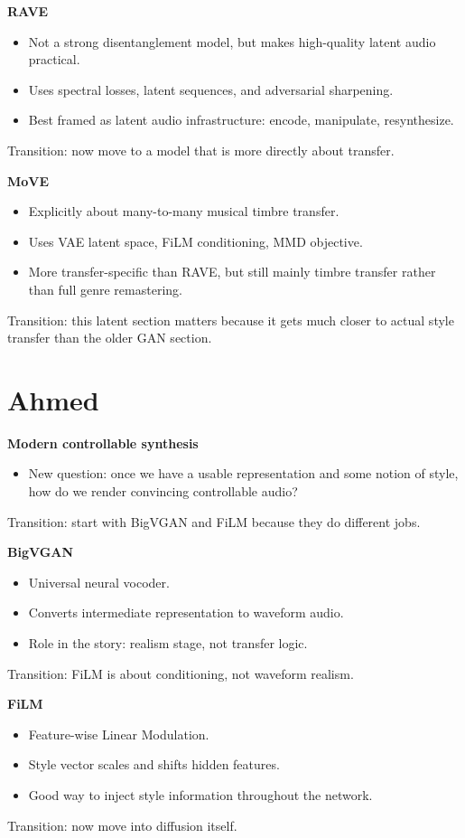 \documentclass[11pt]{article}
\begin{document}
\textbf{RAVE}
\begin{itemize}
\item Not a strong disentanglement model, but makes high-quality latent audio practical.
\item Uses spectral losses, latent sequences, and adversarial sharpening.
\item Best framed as latent audio infrastructure: encode, manipulate, resynthesize.
\end{itemize}
\textcolor{Muted}{Transition: now move to a model that is more directly about transfer.}

\textbf{MoVE}
\begin{itemize}
\item Explicitly about many-to-many musical timbre transfer.
\item Uses VAE latent space, FiLM conditioning, MMD objective.
\item More transfer-specific than RAVE, but still mainly timbre transfer rather than full genre remastering.
\end{itemize}
\textcolor{Muted}{Transition: this latent section matters because it gets much closer to actual style transfer than the older GAN section.}

\section*{Ahmed}

\textbf{Modern controllable synthesis}
\begin{itemize}
\item New question: once we have a usable representation and some notion of style, how do we render convincing controllable audio?
\end{itemize}
\textcolor{Muted}{Transition: start with BigVGAN and FiLM because they do different jobs.}

\textbf{BigVGAN}
\begin{itemize}
\item Universal neural vocoder.
\item Converts intermediate representation to waveform audio.
\item Role in the story: realism stage, not transfer logic.
\end{itemize}
\textcolor{Muted}{Transition: FiLM is about conditioning, not waveform realism.}

\textbf{FiLM}
\begin{itemize}
\item Feature-wise Linear Modulation.
\item Style vector scales and shifts hidden features.
\item Good way to inject style information throughout the network.
\end{itemize}
\textcolor{Muted}{Transition: now move into diffusion itself.}
\end{document}
